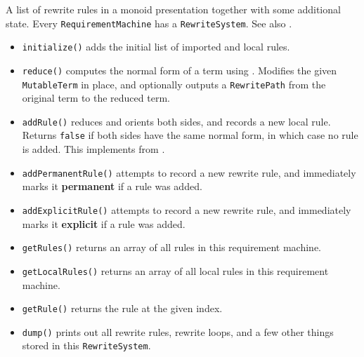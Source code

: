 \documentclass[../generics]{subfiles}
\begin{document}
A list of rewrite rules in a monoid presentation together with some additional state. Every \texttt{RequirementMachine} has a \texttt{RewriteSystem}. See also .
\begin{itemize}
\item \texttt{initialize()} adds the initial list of imported and local rules.
\item \texttt{reduce()} computes the normal form of a term using . Modifies the given \texttt{MutableTerm} in place, and optionally outputs a \texttt{RewritePath} from the original term to the reduced term.
\item \texttt{addRule()} reduces and orients both sides, and records a new local rule. Returns \texttt{false} if both sides have the same normal form, in which case no rule is added. This implements  from .
\item \texttt{addPermanentRule()} attempts to record a new rewrite rule, and immediately marks it \textbf{permanent} if a rule was added.
\item \texttt{addExplicitRule()} attempts to record a new rewrite rule, and immediately marks it \textbf{explicit} if a rule was added.
\item \texttt{getRules()} returns an array of all rules in this requirement machine.
\item \texttt{getLocalRules()} returns an array of all local rules in this requirement machine.
\item \texttt{getRule()} returns the rule at the given index.
\item \texttt{dump()} prints out all rewrite rules, rewrite loops, and a few other things stored in this \texttt{RewriteSystem}.
\end{itemize}
\end{document}
